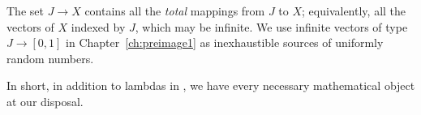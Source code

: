 The set $J \to X$ contains all the \emph{total} mappings from $J$ to $X$; equivalently, all the vectors of $X$ indexed by $J$, which may be infinite.
We use infinite vectors of type $J \to [0,1]$ in Chapter~\ref{ch:preimage1} as inexhaustible sources of uniformly random numbers.

In short, in addition to lambdas in \lzfclang, we have every necessary mathematical object at our disposal.

